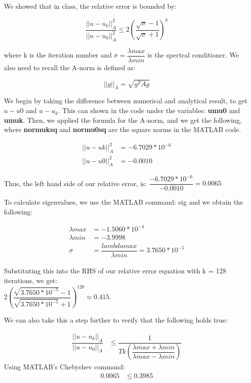 \documentclass{article}
\begin{document}
\noindent
We showed that in class, the relative error is bounded by:

\begin{equation}
	\dfrac{||u-u_k||_A^2}{||u-u_0||_A^2} \leq 2\left(\dfrac{\sqrt{\sigma }-1}{\sqrt{\sigma}+1} \right)^k
\end{equation}

\noindent
where k is the iteration number and $\sigma = \dfrac{\lambda max}{\lambda min}$ is the spectral conditioner.  We also need to recall the A-norm is defined as: 

\begin{equation}
	||g||_A = \sqrt{g^T A g}
\end{equation}

\noindent
We begin by taking the difference between numerical and analytical result, to get $u-u0$ and $u-u_k$.  This can shown in the code under the variables: \textbf{umu0} and \textbf{umuk}. Then, we applied the formula for the A-norm, and we get the following, where \textbf{normuksq} and \textbf{normu0sq} are the square norms in the MATLAB code. 

\begin{align*}
	||u-uk||_A^2 &=   -6.7029*10^{-6} \\
	||u-u0||_A^2 &= -0.0010
\end{align*}

\noindent
Thus, the left hand side of our relative error, is: $\dfrac{-6.7029*10^{-6}}{-0.0010} = 0.0065$

\noindent
To calculate eigenvalues, we use the MATLAB command: eig and we obtain the following: 

\begin{align*}
	\lambda max &= -1.5060*10^{-4} \\
	\lambda min &= -3.9998\\
	\sigma &= \dfrac{lambda max}{\lambda min} =  3.7650*10^{-5}
\end{align*}

\noindent
Substituting this into the RHS of our relative error equation with k = 128 iterations, we get: \\ $2\left(\dfrac{\sqrt{3.7650*10^{-5} }-1}{\sqrt{3.7650*10^{-5}}+1} \right)^{128} \approx 0.415$. 

\noindent
We can also take this a step further to verify that the following holds true: 

\begin{align*}
\dfrac{||u-u_k||_A}{||u-u_0||_A} &\leq \dfrac{1}{Tk\left(\dfrac{\lambda max + \lambda min}{\lambda max - \lambda min}\right)}
\end{align*}
\noindent
\textrm{Using MATLAB's Chebyshev command:} \\
\begin{align*}
0.0065 &\leq 0.3985
\end{align*}
\end{document}
